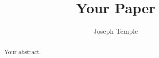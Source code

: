 \documentclass{article}
\title{Your Paper}
\author{Joseph Temple}
\begin{document}
\maketitle


\begin{abstract}
Your abstract.
\end{abstract}
\end{document}
